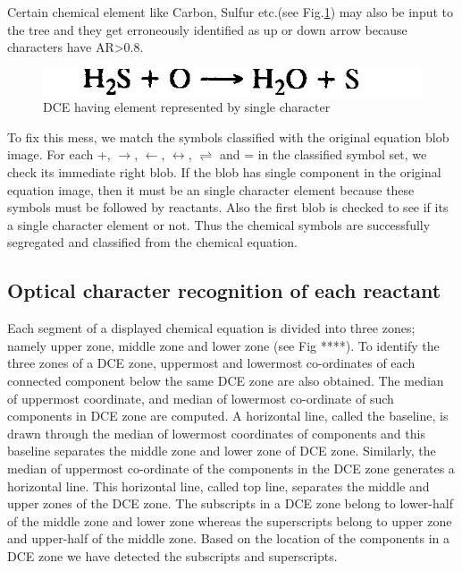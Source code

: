 \documentclass[conference]{IEEEtran}
\begin{document}
Certain chemical element like Carbon, Sulfur etc.(see Fig.\ref{fig:single_char_element}) may also be input to the tree and they get erroneously identified as up or down arrow because characters have AR\textgreater0.8.
 
\begin{figure}[h!]
\centering
\includegraphics[width=0.9\linewidth]{single_char_element} 
\caption{DCE having element represented by single character}
\label{fig:single_char_element}
\end{figure}

To fix this mess, we match the symbols classified with the original equation blob image. For each +, $\rightarrow$,  $\leftarrow$, $\leftrightarrow$,  $\rightleftharpoons$ and = in the classified symbol set, we check its immediate right blob. If the blob has single component in the original equation image, then it must be an single character element because these symbols must be followed by reactants. Also the first blob is checked to see if its a single character element or not. 
Thus the chemical symbols are successfully segregated and classified from the chemical equation.
   
\subsection{Optical character recognition of each reactant}

Each segment of a displayed chemical equation is divided into three zones; namely upper zone, middle zone and lower zone (see Fig ****). To identify the three zones of a DCE zone, uppermost and lowermost co-ordinates of each connected component below the same DCE zone are also obtained. The median of uppermost coordinate, and median of lowermost co-ordinate of such components in DCE zone are computed. A horizontal line, called the baseline, is drawn through the median of lowermost coordinates of components and this baseline separates the middle zone and lower zone of DCE zone. Similarly, the median of uppermost co-ordinate of the components in the DCE zone generates a horizontal line. This horizontal line, called top line, separates the middle and upper zones of the DCE zone. The subscripts in a DCE zone belong to lower-half of the middle zone and lower zone whereas the superscripts belong to upper zone and upper-half of the middle zone. Based on the location of the components in a DCE zone we have detected the subscripts and superscripts.
\end{document}
